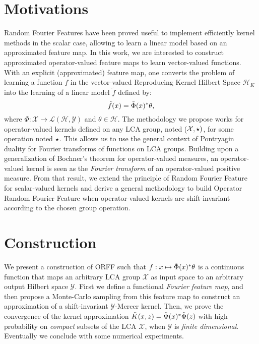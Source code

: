 \section{Motivations}
\label{sec:motivations}
Random Fourier Features have been proved useful to implement efficiently kernel methods in the scalar case, allowing to learn a linear model based on an approximated feature map. In this work, we are interested to construct approximated operator-valued feature maps to learn vector-valued functions. With an explicit (approximated) feature map, one converts the problem of learning a function $f$ in the vector-valued Reproducing Kernel Hilbert Space $\mathcal{H}_K$ into the learning of a linear model $\tilde{f}$ defined by:
 \begin{equation*}
 \tilde{f}(x) = \tilde{\Phi}(x)^* \theta,
 \end{equation*}
 where $\Phi: \mathcal{X} \to \mathcal{L}(\mathcal{H},\mathcal{Y})$ and $\theta \in \mathcal{H}$. The methodology we propose works for operator-valued kernels defined on any \acf{LCA} group, noted ($\mathcal{X}, \star)$, for some operation noted $\star$. This allows us to use the general context of Pontryagin duality for Fourier transforms of functions on \acs{LCA} groups. Building upon a generalization of Bochner's theorem for operator-valued measures, an operator-valued kernel is seen as the \emph{Fourier transform} of an operator-valued positive measure. From that result, we extend the principle of Random Fourier Feature for scalar-valued kernels and derive a general methodology to build Operator Random Fourier Feature when operator-valued kernels are shift-invariant according to the chosen group operation.

\section{Construction}
\label{sec:construction}
We present a construction of \acf{ORFF} such that $f: x\mapsto \tilde{\Phi}(x)^*\theta$ is a continuous function that maps an arbitrary \acs{LCA} group $\mathcal{X}$ as input space to an arbitrary output Hilbert space $\mathcal{Y}$. First we define a functional \emph{Fourier feature map}, and then propose a Monte-Carlo sampling from this feature map to construct an approximation of a shift-invariant $\mathcal{Y}$-Mercer kernel.
Then, we prove the convergence of the kernel approximation $\tilde{K}(x,z)=\tilde{\Phi}(x)^*\tilde{\Phi}(z)$ with high probability on \emph{compact} subsets of the \acs{LCA} $\mathcal{X}$, when $\mathcal{Y}$ is \emph{finite dimensional}. Eventually we conclude with some numerical experiments.
